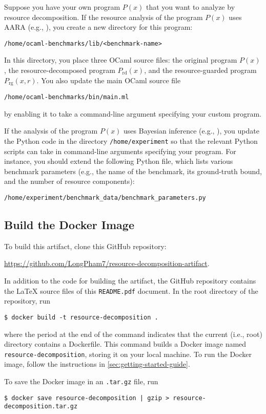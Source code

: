 Suppose you have your own program $P(x)$ that you want to analyze by resource
decomposition.
%
If the resource analysis of the program $P(x)$ uses AARA (e.g.,
), you
create a new directory for this program:
\begin{verbatim}
/home/ocaml-benchmarks/lib/<benchmark-name>
\end{verbatim}
%
In this directory, you place three OCaml source files: the original program
$P(x)$, the resource-decomposed program $P_{\mathrm{rd}}(x)$, and the
resource-guarded program $P_{\mathrm{rg}}(x, r)$.
%
You also update the main OCaml source file
\begin{verbatim}
/home/ocaml-benchmarks/bin/main.ml
\end{verbatim}
by enabling it to take a command-line argument specifying your custom program.

If the analysis of the program $P(x)$ uses Bayesian inference (e.g.,
), you
update the Python code in the directory \texttt{/home/experiment} so that the
relevant Python scripts can take in command-line arguments specifying your
program.
%
For instance, you should extend the following Python file, which lists various
benchmark parameters (e.g., the name of the benchmark, its ground-truth bound,
and the number of resource components):
\begin{verbatim}
/home/experiment/benchmark_data/benchmark_parameters.py
\end{verbatim}

\subsection{Build the Docker Image}

To build this artifact, clone this GitHub repository:
\begin{center}
  \url{https://github.com/LongPham7/resource-decomposition-artifact}.
\end{center}
%
In addition to the code for building the artifact, the GitHub repository
contains the \LaTeX{} source files of this \texttt{README.pdf} document.
%
In the root directory of the repository, run
\begin{verbatim}
$ docker build -t resource-decomposition .
\end{verbatim}
where the period at the end of the command indicates that the current (i.e.,
root) directory contains a Dockerfile.
%
This command builds a Docker image named \texttt{resource-decomposition},
storing it on your local machine.
%
To run the Docker image, follow the instructions in
\cref{sec:getting-started-guide}.

To save the Docker image in an \texttt{.tar.gz} file, run
\begin{verbatim}
$ docker save resource-decomposition | gzip > resource-decomposition.tar.gz
\end{verbatim}
